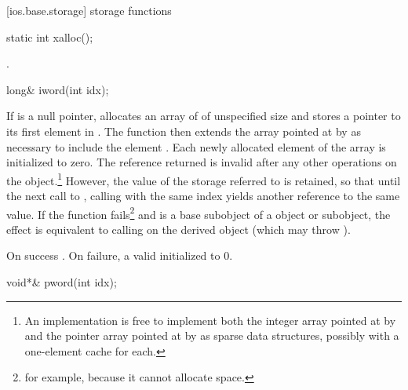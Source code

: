[ios.base.storage]{ storage functions}

%
\begin{itemdecl}
static int xalloc();
\end{itemdecl}

\begin{itemdescr}
\pnum
\returns
{}
\tcode{++}.
\end{itemdescr}

%
\begin{itemdecl}
long& iword(int idx);
\end{itemdecl}

\begin{itemdescr}
\pnum
\effects
If  is a null pointer, allocates an array of
of unspecified size and stores a pointer to its first element in
.
The function then extends the array pointed at by
 as necessary to include the element
.
Each newly allocated element of the array is initialized to zero.
The reference returned is invalid after any other operations on the
object.\footnote{An implementation is free to implement both the integer
array pointed at by  and the pointer array pointed at by
 as sparse data structures, possibly with a one-element
cache for each.}
However, the value of the storage referred to is retained, so
that until the next call to
,
calling
with the same index yields another reference to the same value.
If the function fails\footnote{for example, because it cannot allocate space.}
and
is a base subobject of a
object or subobject, the effect is equivalent to calling
on the derived object (which may throw
).

\pnum
\returns
On success
.
On failure, a valid
initialized to 0.
\end{itemdescr}

%
\begin{itemdecl}
void*& pword(int idx);
\end{itemdecl}

